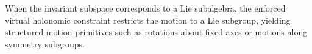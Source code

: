 \documentclass[letterpaper, 10 pt, conference]{ieeeconf}
\newtheorem{remark}{Remark}
\newcommand{\grad}{\normalfont{\text{grad}}}
\begin{document}







When the invariant subspace corresponds to a Lie subalgebra, the enforced virtual holonomic constraint restricts the motion to a Lie subgroup, yielding structured motion primitives such as rotations about fixed axes or motions along symmetry subgroups.
\end{document}
